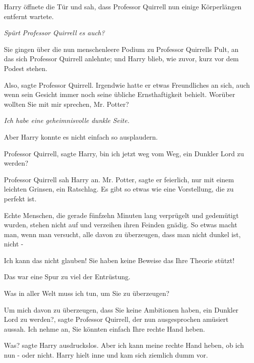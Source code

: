 Harry öffnete die Tür und sah, dass Professor Quirrell nun einige Körperlängen
entfernt wartete.

\emph{Spürt Professor Quirrell es auch?}

Sie gingen über die nun menschenleere Podium zu Professor Quirrells Pult, an das
sich Professor Quirrell anlehnte; und Harry blieb, wie zuvor, kurz vor dem
Podest stehen.

\glqq{}Also\grqq{}, sagte Professor Quirrell. Irgendwie hatte er etwas
Freundliches an sich, auch wenn sein Gesicht immer noch seine übliche
Ernsthaftigkeit behielt. \glqq{}Worüber wollten Sie mit mir sprechen, Mr.
Potter?\grqq{}

\emph{Ich habe eine geheimnisvolle dunkle Seite.}

Aber Harry konnte es nicht einfach so ausplaudern.

\glqq{}Professor Quirrell\grqq{}, sagte Harry, \glqq{}bin ich jetzt weg vom Weg,
ein Dunkler Lord zu werden?\grqq{}

Professor Quirrell sah Harry an. \glqq{}Mr. Potter\grqq{}, sagte er feierlich,
nur mit einem leichten Grinsen, \glqq{}ein Ratschlag. Es gibt so etwas wie eine
Vorstellung, die zu perfekt ist.

Echte Menschen, die gerade fünfzehn Minuten lang verprügelt und gedemütigt
wurden, stehen nicht auf und verzeihen ihren Feinden gnädig. So etwas macht man,
wenn man versucht, alle davon zu überzeugen, dass man nicht dunkel ist, nicht
-\grqq{}

\glqq{}Ich kann das nicht glauben! Sie haben keine Beweise das Ihre Theorie
stützt!\grqq{}

\glqq{}Das war eine Spur zu viel der Entrüstung.\grqq{}

\glqq{}Was in aller Welt muss ich tun, um Sie zu überzeugen?\grqq{}

\glqq{}Um mich davon zu überzeugen, dass Sie keine Ambitionen haben, ein Dunkler
Lord zu werden?\grqq{}, sagte Professor Quirrell, der nun ausgesprochen amüsiert
aussah. \glqq{}Ich nehme an, Sie könnten einfach Ihre rechte Hand heben.\grqq{}

\glqq{}Was?\grqq{} sagte Harry ausdruckslos. \glqq{}Aber ich kann meine rechte
Hand heben, ob ich nun - oder nicht.\grqq{} Harry hielt inne und kam sich
ziemlich dumm vor.

